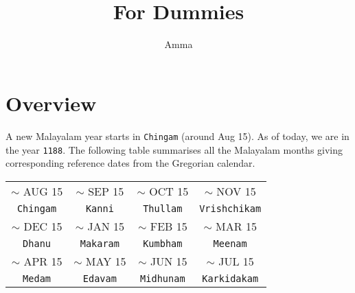 \documentclass[10pt,twoside]{article}
\title{\textbf{\doctitle}\\
For Dummies}
\author{Amma}
\begin{document}
\thispagestyle{empty}

\maketitle

\section{Overview}
A new Malayalam year starts in \verb|Chingam| (around Aug 15). As of today, we are in the year \verb|1188|. The following table summarises all the Malayalam months giving corresponding reference dates from the Gregorian calendar.

\begin{table}[!h]
\centering
\begin{tabular}{| c | c | c | c |}
\hline
$\sim$ AUG 15 & $\sim$ SEP 15 & $\sim$ OCT 15 & $\sim$ NOV 15 \\ 
\verb|Chingam| & \verb|Kanni| & \verb|Thullam| & \verb|Vrishchikam| \\ \hline
$\sim$ DEC 15 & $\sim$ JAN 15 & $\sim$ FEB 15 & $\sim$ MAR 15 \\ 
\verb|Dhanu| & \verb|Makaram| & \verb|Kumbham| & \verb|Meenam| \\ \hline
$\sim$ APR 15 & $\sim$ MAY 15 & $\sim$ JUN 15 & $\sim$ JUL 15 \\ 
\verb|Medam| & \verb|Edavam| & \verb|Midhunam| & \verb|Karkidakam| \\ \hline
\end{tabular}
\label{table:overview}
\end{table}
\end{document}

